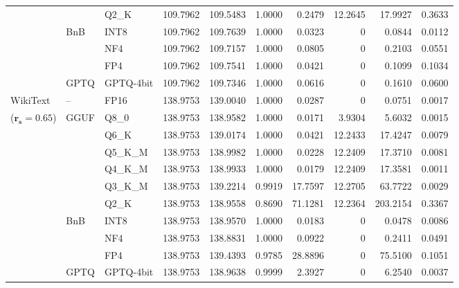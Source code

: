 \begin{longtable}{ll l rrrrrrr}
 &  & Q2\_K & 109.7962 & 109.5483 & 1.0000 & 0.2479 & 12.2645 & 17.9927 & 0.3633 \\
 & BnB & INT8 & 109.7962 & 109.7639 & 1.0000 & 0.0323 & \cellcolor{cyan!12} $0$ & 0.0844 & 0.0112 \\
 &  & NF4 & 109.7962 & 109.7157 & 1.0000 & 0.0805 & \cellcolor{cyan!12} $0$ & 0.2103 & 0.0551 \\
 &  & FP4 & 109.7962 & 109.7541 & 1.0000 & 0.0421 & \cellcolor{cyan!12} $0$ & 0.1099 & 0.1034 \\
 & GPTQ & GPTQ-4bit & 109.7962 & 109.7346 & 1.0000 & 0.0616 & \cellcolor{cyan!12} $0$ & 0.1610 & 0.0600 \\
\midrule
WikiText & -- & FP16 & 138.9753 & 139.0040 & 1.0000 & 0.0287 & \cellcolor{cyan!12} $0$ & 0.0751 & 0.0017 \\
{\small ($\mathbf{r_s{=}0.65}$)} & GGUF & Q8\_0 & 138.9753 & 138.9582 & 1.0000 & 0.0171 & 3.9304 & 5.6032 & 0.0015 \\
 &  & Q6\_K & 138.9753 & 139.0174 & 1.0000 & 0.0421 & 12.2433 & 17.4247 & 0.0079 \\
 &  & Q5\_K\_M & 138.9753 & 138.9982 & 1.0000 & 0.0228 & 12.2409 & 17.3710 & 0.0081 \\
 &  & Q4\_K\_M & 138.9753 & 138.9933 & 1.0000 & 0.0179 & 12.2409 & 17.3581 & 0.0011 \\
 &  & Q3\_K\_M & 138.9753 & 139.2214 & 0.9919 & 17.7597 & 12.2705 & 63.7722 & 0.0029 \\
 &  & Q2\_K & 138.9753 & 138.9558 & \cellcolor{red!18} 0.8690 & \cellcolor{red!18} 71.1281 & 12.2364 & \cellcolor{red!18} 203.2154 & \cellcolor{red!18} 0.3367 \\
 & BnB & INT8 & 138.9753 & 138.9570 & 1.0000 & 0.0183 & \cellcolor{cyan!12} $0$ & 0.0478 & 0.0086 \\
 &  & NF4 & 138.9753 & 138.8831 & 1.0000 & 0.0922 & \cellcolor{cyan!12} $0$ & 0.2411 & 0.0491 \\
 &  & FP4 & 138.9753 & 139.4393 & 0.9785 & 28.8896 & \cellcolor{cyan!12} $0$ & 75.5100 & 0.1051 \\
 & GPTQ & GPTQ-4bit & 138.9753 & 138.9638 & 0.9999 & 2.3927 & \cellcolor{cyan!12} $0$ & 6.2540 & 0.0037 \\
\end{longtable}
\endgroup